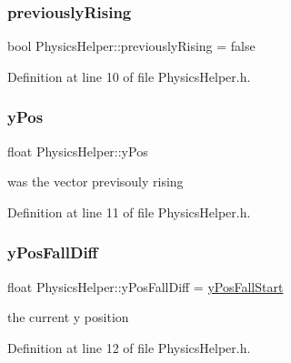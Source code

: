\subsubsection{\texorpdfstring{previously\+Rising}{previouslyRising}}
{\footnotesize\ttfamily bool Physics\+Helper\+::previously\+Rising = false\hspace{0.3cm}{\ttfamily [private]}}



Definition at line 10 of file Physics\+Helper.\+h.

\mbox{\label{class_physics_helper_a8d1eda19cdbede456e4fb973a19802a4}} 
\subsubsection{\texorpdfstring{y\+Pos}{yPos}}
{\footnotesize\ttfamily float Physics\+Helper\+::y\+Pos\hspace{0.3cm}{\ttfamily [private]}}



was the vector previsouly rising 



Definition at line 11 of file Physics\+Helper.\+h.

\mbox{\label{class_physics_helper_a0c1293f0d07c93ffa688f67285327d35}} 
\subsubsection{\texorpdfstring{y\+Pos\+Fall\+Diff}{yPosFallDiff}}
{\footnotesize\ttfamily float Physics\+Helper\+::y\+Pos\+Fall\+Diff = \mbox{\hyperlink{class_physics_helper_a11582a39916e5ec33325d99d1d67235a}{y\+Pos\+Fall\+Start}}\hspace{0.3cm}{\ttfamily [private]}}



the current y position 



Definition at line 12 of file Physics\+Helper.\+h.

\mbox{\label{class_physics_helper_a20ab7f606d89b0b12ffdd0a68136da2e}} 
